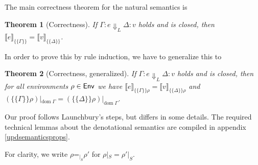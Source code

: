 \documentclass{jfp1}
\newtheorem{theorem}{Theorem}
\theoremstyle{nonumberbreak}
\newcommand{\sEnv}   {\text{\textsf{Env}}}
\newcommand{\sred}[5]{#1 : #2 \Downarrow_{#3} #4 : #5}
\newcommand{\sRule}[1]{\text{{\textsc{#1}}}}
\newcommand{\dom}[1]{\text{dom}\;#1}
\newcommand{\dsem}[2]{\llbracket #1 \rrbracket_{#2}}
\newcommand{\esem}[1]{\{\!\!\!\{#1\}\!\!\!\}}
\newcommand{\eqon}[1]{\mathrel{\mathord=_{\mathord|_{#1}}}}
\begin{document}
The main correctness theorem for the natural semantics is
\begin{theorem}[Correctness]
If $\sred \Gamma e L \Delta v$ holds and is closed, then $\dsem{e}{\esem{\Gamma}} = \dsem{v}{\esem{\Delta}}$.
\label{thm_main}
\end{theorem}

In order to prove this by rule induction, we have to generalize this to

\begin{theorem}[Correctness, generalized]
If $\sred \Gamma e L \Delta v$ holds and is closed, then for all environments $\rho \in \sEnv$ we have $\dsem{e}{\esem{\Gamma}{\rho}} = \dsem{v}{\esem{\Delta}{\rho}}$ and $(\esem\Gamma\rho)|_{\dom\Gamma} = (\esem\Delta\rho)|_{\dom\Gamma}$.%
\label{thm_thm2}
\end{theorem}

Our proof follows Launchbury's steps, but differs in some details.
The required technical lemmas about the denotational semantics are compiled in appendix \ref{updsemanticsprops}.

For clarity, we write $\rho \eqon{S} \rho'$ for $\rho|_S = \rho'|_S$.
\end{document}
